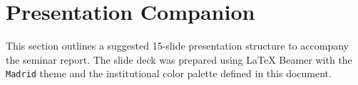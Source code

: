 \chapter*{Presentation Companion}

This section outlines a suggested 15-slide presentation structure to accompany the seminar report. The slide deck was prepared using LaTeX Beamer with the \texttt{Madrid} theme and the institutional color palette defined in this document.
